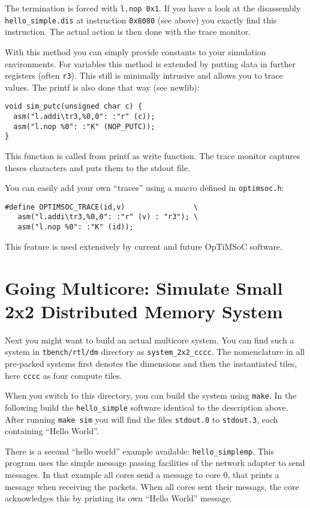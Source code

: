 The termination is forced with \verb|l.nop 0x1|. If you have a look at
the disassembly \verb|hello_simple.dis| at instruction \verb|0x8080|
(see above) you exactly find this instruction. The actual action is
then done with the trace monitor.

With this method you can simply provide constants to your simulation
environments. For variables this method is extended by putting data in
further registers (often \verb|r3|). This still is minimally intrusive
and allows you to trace values. The printf is also done that way (see
newlib):

\begin{verbatim}
void sim_putc(unsigned char c) {
  asm("l.addi\tr3,%0,0": :"r" (c));
  asm("l.nop %0": :"K" (NOP_PUTC));
}
\end{verbatim}

This function is called from printf as write function. The trace
monitor captures theses characters and puts them to the stdout file.

You can easily add your own ``traces'' using a macro defined in
\verb|optimsoc.h|:

\begin{verbatim}
#define OPTIMSOC_TRACE(id,v)                \
   asm("l.addi\tr3,%0,0": :"r" (v) : "r3"); \
   asm("l.nop %0": :"K" (id));
\end{verbatim}

This feature is used extensively by current and future OpTiMSoC software.

\section{Going Multicore: Simulate Small 2x2 Distributed Memory
  System}

Next you might want to build an actual multicore system. You can find
such a system in \verb|tbench/rtl/dm| directory as
\verb|system_2x2_cccc|. The nomenclature in all pre-packed systems
first denotes the dimensions and then the instantiated tiles, here
\verb|cccc| as four compute tiles.

When you switch to this directory, you can build the system using
\verb|make|. In the following build the \verb|hello_simple| software
identical to the description above. After running \verb|make sim| you
will find the files \verb|stdout.0| to \verb|stdout.3|, each
containing ``Hello World''.

There is a second ``hello world'' example available:
\verb|hello_simplemp|. This program uses the simple message passing
facilities of the network adapter to send messages. In that example
all cores send a message to core 0, that prints a message when
receiving the packets. When all cores sent their messags, the core
acknowledges this by printing its own ``Hello World'' message.

